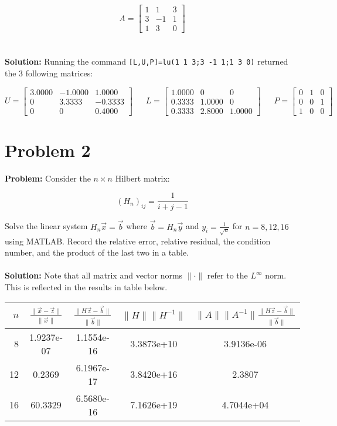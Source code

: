 \documentclass{article}
\begin{document}
$$A=\begin{bmatrix}
1&1&3\\3&-1&1\\1&3&0
\end{bmatrix}$$
\\\\
\textbf{Solution:} Running the command \verb|[L,U,P]=lu(1 1 3;3 -1 1;1 3 0)| returned the 3 following matrices:

$$U=\begin{bmatrix}
3.0000&-1.0000&1.0000\\0&3.3333&-0.3333\\0&0&0.4000
\end{bmatrix}\ \ \ \ \ \ \
L=\begin{bmatrix}
1.0000&0&0\\0.3333&1.0000&0\\0.3333&2.8000&1.0000
\end{bmatrix}\ \ \ \ \ \ \
P=\begin{bmatrix}
0&1&0\\0&0&1\\1&0&0
\end{bmatrix}$$

\section*{Problem 2}
\textbf{Problem:} Consider the $n\times n$ Hilbert matrix:

$$(H_n)_{ij}=\frac{1}{i+j-1}$$

Solve the linear system $H_n\vec x=\vec b$ where $\vec b=H_n\vec y$ and $y_i=\frac{1}{\sqrt n}$ for $n=8,12,16$ using MATLAB. Record the relative error, relative residual, the condition number, and the product of the last two in a table.
\\\\
\textbf{Solution:} Note that all matrix and vector norms $\|\cdot\|$ refer to the $L^\infty$ norm. This is reflected in the results in table below.
\begin{center}
\begin{tabular}{r|c|c|c|c}
      $n$ & $\frac{\|\vec x-\vec z\|}{\|\vec x\|}$ & $\frac{\|H\vec z-\vec b\|}{\|\vec b\|}$ & $\|H\|\|H^{-1}\|$ & $\|A\|\|A^{-1}\|\frac{\|H\vec z-\vec b\|}{\|\vec b\|}$ \\
      \hline
      8 & 1.9237e-07 & 1.1554e-16 & 3.3873e+10 & 3.9136e-06\\
      12 & 0.2369 & 6.1967e-17 & 3.8420e+16 & 2.3807\\
      16 & 60.3329 & 6.5680e-16 & 7.1626e+19 & 4.7044e+04
\end{tabular}
\end{center}
\end{document}
